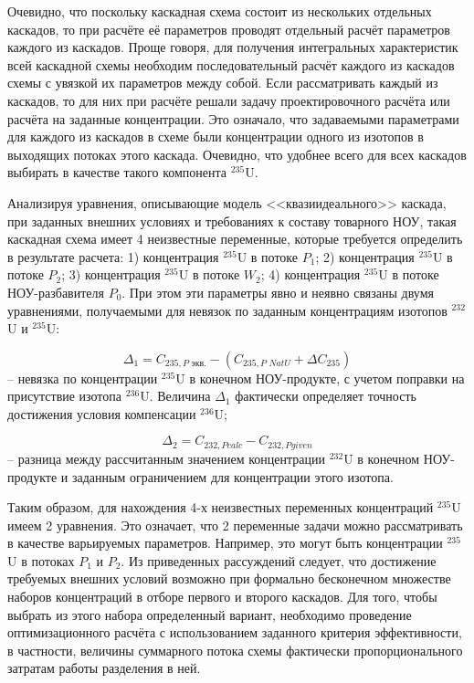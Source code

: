 Очевидно, что поскольку каскадная схема состоит из нескольких отдельных каскадов, то при расчёте её параметров проводят отдельный расчёт параметров каждого из каскадов. Проще говоря, для получения интегральных характеристик всей каскадной схемы необходим последовательный расчёт каждого из каскадов схемы с увязкой их параметров между собой. Если рассматривать каждый из каскадов, то для них при расчёте решали задачу проектировочного расчёта или расчёта на заданные концентрации. Это означало, что задаваемыми параметрами для каждого из каскадов в схеме были концентрации одного из изотопов в выходящих потоках этого каскада. Очевидно, что удобнее всего для всех каскадов выбирать в качестве такого компонента $^{235}$U.

Анализируя уравнения, описывающие модель <<квазиидеального>> каскада, при заданных внешних условиях и требованиях к составу товарного НОУ, такая каскадная схема имеет 4 неизвестные переменные, которые требуется определить в результате расчета: 1) концентрация $^{235}$U в потоке $P_{1}$; 2) концентрация $^{235}$U в потоке $P_{2}$; 3) концентрация $^{235}$U в потоке $W_{2}$; 4) концентрация $^{235}$U в потоке НОУ-разбавителя $P_{0}$. При этом эти параметры явно и неявно связаны двумя уравнениями, получаемыми для невязок по заданным концентрациям изотопов $^{232}$U и $^{235}$U:


\begin{equation}
    \label{dis_235_6}
    \Delta_{1}=C_{235,P\textit{ экв.}}-(C_{235,P\textit{ NatU}}+\Delta C_{235})
  \end{equation}
  -- невязка по концентрации $^{235}$U в конечном НОУ-продукте, с учетом поправки на присутствие изотопа $^{236}$U. Величина $\Delta_{1}$ фактически определяет точность достижения условия компенсации $^{236}$U;

  \begin{equation}
    \label{dis_232}
    \Delta_{2}=C_{232,P\textit{calc}}-C_{232,P\textit{given}}
  \end{equation}
  -- разница между рассчитанным значением концентрации $^{232}$U в конечном НОУ-продукте и заданным ограничением для концентрации этого изотопа.

Таким образом, для нахождения 4-х неизвестных переменных концентраций $^{235}$U имеем 2 уравнения. Это означает, что 2 переменные задачи можно рассматривать в качестве варьируемых параметров. Например, это могут быть концентрации  $^{235}$U в потоках $P_{1}$ и $P_{2}$. Из приведенных рассуждений следует, что достижение требуемых внешних условий возможно при формально бесконечном множестве наборов концентраций в отборе первого и второго каскадов. Для того, чтобы выбрать из этого набора определенный вариант, необходимо проведение оптимизационного расчёта с использованием заданного критерия эффективности, в частности, величины суммарного потока схемы фактически пропорционального затратам работы разделения в ней. 

